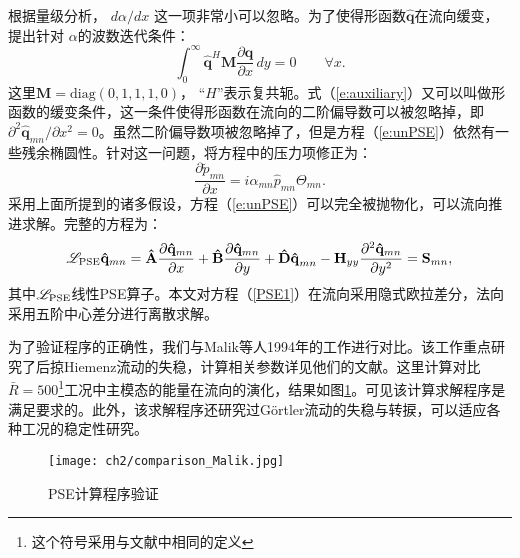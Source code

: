 根据量级分析\cite{Malik1999}， ${{d\alpha }}/{dx}$ 这一项非常小可以忽略。为了使得形函数$\mathbf{\hat q}$在流向缓变，提出针对 $\alpha$的波数迭代条件：
\begin{equation}
\label{e:auxiliary}
    \int_0^\infty  {{\mathbf{\hat q}}^H {\mathbf{M}}\frac{{\partial {\mathbf{\hat q}}}}{{\partial x}}\,dy}  = 0\qquad\forall x.
\end{equation}
这里$\mathbf{M}=\mathrm{diag}(0,1,1,1,0)$， ``$H$''表示复共轭。式（\ref{e:auxiliary}）又可以叫做形函数的缓变条件，这一条件使得形函数在流向的二阶偏导数可以被忽略掉，即${{\partial ^2 {\mathbf{\hat q}}_{mn} }}/{{\partial x^2 }}=0$\cite{Malik1994}。虽然二阶偏导数项被忽略掉了，但是方程（\ref{e:unPSE}）依然有一些残余椭圆性\cite{LiMalik1996}。针对这一问题，将方程中的压力项修正为：
\begin{equation}
    \frac{\partial \tilde p_{mn}}{\partial x} = i\alpha_{mn}\hat p_{mn}\Theta_{mn}.
\end{equation}
采用上面所提到的诸多假设，方程（\ref{e:unPSE}）可以完全被抛物化，可以流向推进求解。完整的方程为：
\begin{equation}
\label{PSE1}
    \mathscr{L}_{\rm PSE}{\mathbf{\hat q}}_{mn}  = {\mathbf{\hat A}}\frac{{\partial {\mathbf{\hat q}}_{mn} }}
    {{\partial x}} + {\mathbf{\hat B}}\frac{{\partial {\mathbf{\hat q}}_{mn} }}
    {{\partial y}} + {\mathbf{\hat D\hat q}}_{mn}  - {\mathbf{H}}_{yy} \frac{{\partial ^2 {\mathbf{\hat q}}_{mn} }}
    {{\partial y^2 }} = {\mathbf{S}}_{mn},
\end{equation}
其中$\mathscr{L}_{\rm PSE}$线性PSE算子。本文对方程（\ref{PSE1}）在流向采用隐式欧拉差分，法向采用五阶中心差分进行离散求解。

为了验证程序的正确性，我们与Malik等人1994年的工作\cite{Malik1994}进行对比。该工作重点研究了后掠Hiemenz流动的失稳，计算相关参数详见他们的文献。这里计算对比$\bar{R}=500$\footnote{这个符号采用与文献\cite{Malik1994}中相同的定义}工况中主模态的能量在流向的演化，结果如图\ref{f:com_malik}。可见该计算求解程序是满足要求的。此外，该求解程序还研究过G\"ortler流动的失稳与转捩\cite{Ren2014a,Ren2014b,Ren2014c,Ren2015,Ren2016,Renphd}，可以适应各种工况的稳定性研究。
\begin{figure}
  \centering
  \texttt{[image: ch2/comparison\_Malik.jpg]}
  \caption{PSE计算程序验证}\label{f:com_malik}
\end{figure}


